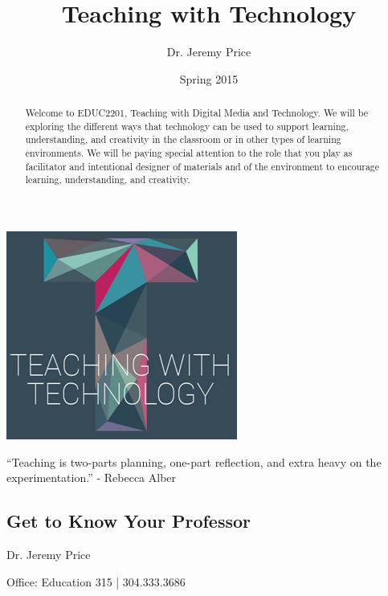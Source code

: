 \documentclass{tufte-handout}
\title{Teaching with Technology}
\author{Dr. Jeremy Price}
\date{Spring 2015}  %
\begin{document}
\maketitle%


\begin{abstract}
Welcome to EDUC2201, Teaching with Digital Media and Technology. We will be exploring the different ways that technology can be used to support learning, understanding, and creativity in the classroom or in other types of learning environments. We will be paying special attention to the role that you play as facilitator and intentional designer of materials and of the environment to encourage learning, understanding, and creativity.\end{abstract}

\bigskip

\begin{fullwidth}
\begin{center}

	\includegraphics[width=0.20\linewidth]{twt-logo.png}

	\bigskip

	\Large
	\enquote{Teaching is two-parts planning, one-part reflection, and extra heavy on the experimentation.} - Rebecca Alber

	\normalsize
\end{center}
\end{fullwidth}

\vfill

\subsection{Get to Know Your Professor}

\noindent Dr. Jeremy Price

\noindent Office: Education 315 | 304.333.3686
\end{document}
